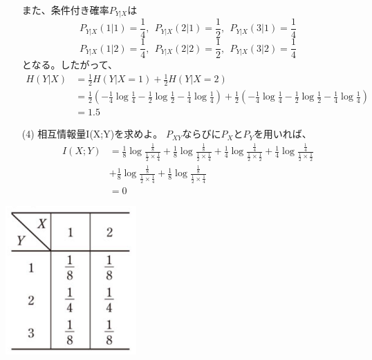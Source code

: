 \documentclass[a4j,uplatex,dvipdfmx]{jsarticle}
\begin{document}
\begin{itemize}
\begin{equation}
\begin{split}
    \end{split}
  \end{equation}
  また、条件付き確率$P_{Y|X}$は
  \begin{equation}
    P_{Y|X}(1|1)=\frac{1}{4},~~P_{Y|X}(2|1)=\frac{1}{2},~~P_{Y|X}(3|1)=\frac{1}{4}
  \end{equation}
  \begin{equation}
    P_{Y|X}(1|2)=\frac{1}{4},~~P_{Y|X}(2|2)=\frac{1}{2},~~P_{Y|X}(3|2)=\frac{1}{4}
  \end{equation}
  となる。したがって、
  \begin{equation}
    \begin{split}
      H(Y|X)&=\frac{1}{2}H(Y|X=1)+\frac{1}{2}H(Y|X=2)\\
      &=\frac{1}{2}\left( -\frac{1}{4}\log{\frac{1}{4}}-\frac{1}{2}\log{\frac{1}{2}}-\frac{1}{4}\log{\frac{1}{4}} \right)+\frac{1}{2}\left( -\frac{1}{4}\log{\frac{1}{4}}-\frac{1}{2}\log{\frac{1}{2}}-\frac{1}{4}\log{\frac{1}{4}} \right)\\
      &=1.5
    \end{split}
  \end{equation}
  \item[(4)]相互情報量I(X;Y)を求めよ。
  $P_{XY}$ならびに$P_X$と$P_Y$を用いれば、
  \begin{equation}
    \begin{split}
      I(X;Y)&=\frac{1}{8}\log{\frac{\frac{1}{8}}{\frac{1}{2}\times \frac{1}{4}}}+\frac{1}{8}\log{\frac{\frac{1}{8}}{\frac{1}{2}\times \frac{1}{4}}}+\frac{1}{4}\log{\frac{\frac{1}{4}}{\frac{1}{2}\times \frac{1}{2}}}+\frac{1}{4}\log{\frac{\frac{1}{4}}{\frac{1}{2}\times \frac{1}{2}}} \\
      &+\frac{1}{8}\log{\frac{\frac{1}{8}}{\frac{1}{2}\times \frac{1}{4}}}+\frac{1}{8}\log{\frac{\frac{1}{8}}{\frac{1}{2}\times \frac{1}{4}}}\\
      &=0
    \end{split}
  \end{equation}
\end{itemize}
\includegraphics[width=5cm]{sec19fig.png}
\end{document}
